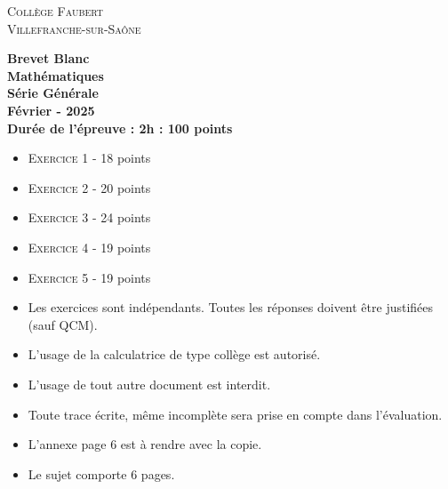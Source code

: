 






\begin{titlepage}

    \center %
    
    \textsc{\LARGE Collège Faubert}\\[1cm] %
    \textsc{\large Villefranche-sur-Saône}\\[0.5cm] %
    
    \horrule{2px}
    
    \vspace{0.5cm}
    
    {\Huge \bfseries Brevet Blanc}\\[1cm] %
    {\Huge \bfseries Mathématiques}\\[1cm] %
    {\Huge  \bfseries Série Générale}\\[1cm]
    {\large \bfseries Février - 2025}\\[1cm] 
    {\bfseries Durée de l'épreuve : 2h : 100 points}\\[1cm] 
    
    \horrule{2px}
    
    \vspace{0.5cm}
    
    \begin{itemize}[label={$\bullet$}]
      \item \textsc{Exercice 1} - 18 points     
      \item \textsc{Exercice 2} - 20 points 
      \item \textsc{Exercice 3} - 24 points
      \item \textsc{Exercice 4} - 19 points 
      \item \textsc{Exercice 5} - 19 points  
    \end{itemize}
    
    \vspace{0.5cm}
    
    \horrule{2px}
    
    \vspace{0.5cm}
    
    \begin{itemize}
      \item Les exercices sont indépendants. Toutes les réponses doivent être justifiées (sauf QCM).
      \item L'usage de la calculatrice de type collège est autorisé.
      \item L'usage de tout autre document est interdit. 
      \item Toute trace écrite, même incomplète sera prise en compte dans l'évaluation.
      \item L’annexe page 6 est à rendre avec la copie.
      \item Le sujet comporte 6 pages.
    \end{itemize}
    

\end{titlepage}
